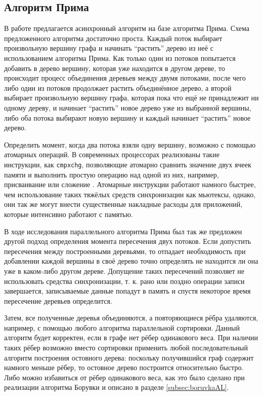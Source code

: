 \documentclass[a4paper,12pt]{extarticle}
\begin{document}
\subsection{Алгоритм Прима}
\label{subsec:algoPrim}

В работе \cite{boruvka-prima} предлагается асинхронный алгоритм на базе алгоритма Прима.
Схема предложенного алгоритма достаточно проста.
Каждый поток выбирает произвольную вершину графа и начинать ``растить'' дерево из  неё с использованием алгоритма Прима.
Как только один из потоков попытается добавить в дерево вершину, которая уже находится в другом дереве, то происходит процесс объединения деревьев между двумя потоками, после чего либо один из потоков продолжает растить объединённое дерево, а второй выбирает произвольную вершину графа, которая пока что ещё не принадлежит ни одному дереву, и начинает ``растить'' новое дерево уже из выбранной вершины, либо оба потока выбирают новую вершину и каждый начинает ``растить'' новое дерево.

Определить момент, когда два потока взяли одну вершину, возможно с помощью атомарных операций.
В современных процессорах реализованы такие инструкции, как \texttt{cmpxchg}, позволяющие атомарно сравнить значение двух ячеек памяти и выполнить простую операцию над одной из них, например, присваивание или сложение \cite{intel-cmpxchg}.
Атомарные инструкции работают намного быстрее, чем использование таких тяжёлых средств синхронизации как мьютексы, однако, они так же могут внести существенные накладные расходы для приложений, которые интенсивно работают с памятью.

В ходе исследования параллельного алгоритма Прима был так же предложен другой подход определения момента пересечения двух потоков.
Если допустить пересечения между построенными деревьями, то отпадает необходимость при добавлении каждой вершины в своё дерево точно определять не находится ли она уже в каком-либо другом дереве.
Допущение таких пересечений позволяет не использовать средства синхронизации, т. к. рано или поздно операции записи завершается, записываемые данные попадут в память и спустя некоторое время пересечение деревьев определится.

Затем, все полученные деревья объединяются, а повторяющиеся рёбра удаляются, например, с помощью любого алгоритма параллельной сортировки.
Данный алгоритм будет корректен, если в графе нет рёбер одинакового веса.
При наличии таких рёбер возможно вместо сортировки применить любой последовательный алгоритм построения остовного дерева: поскольку получившийся граф содержит намного меньше рёбер, то остовное дерево построится относительно быстро.
Либо можно избавиться от рёбер одинакового веса, как это было сделано при реализации алгоритма Борувки и описано в разделе \ref{subsec:boruvkaAL}.
\end{document}
